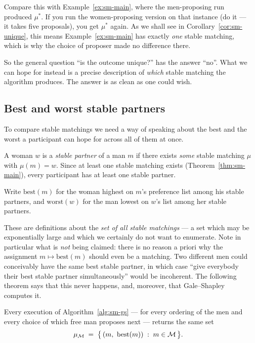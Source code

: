 \begin{remark}
Compare this with Example~\ref{ex:sm-main}, where the men-proposing run produced
$\mu^*$. If you run the women-proposing version on that instance (do it --- it
takes five proposals), you get $\mu^*$ again. As we shall see in
Corollary~\ref{cor:sm-unique}, this means Example~\ref{ex:sm-main} has exactly
\emph{one} stable matching, which is why the choice of proposer made no
difference there.
\end{remark}

So the general question ``is the outcome unique?'' has the answer ``no''. What
we can hope for instead is a precise description of \emph{which} stable
matching the algorithm produces. The answer is as clean as one could wish.

\subsection{Best and worst stable partners}

To compare stable matchings we need a way of speaking about the best and the
worst a participant can hope for across all of them at once.

\begin{definition}
A woman $w$ is a \emph{stable partner} of a man $m$ if there exists \emph{some}
stable matching $\mu$ with $\mu(m) = w$. Since at least one stable matching
exists (Theorem~\ref{thm:sm-main}), every participant has at least one stable
partner.

Write $\mathrm{best}(m)$ for the woman highest on $m$'s preference list among
his stable partners, and $\mathrm{worst}(w)$ for the man lowest on $w$'s list
among her stable partners.
\end{definition}

These are definitions about the \emph{set of all stable matchings} --- a set
which may be exponentially large and which we certainly do not want to
enumerate. Note in particular what is \emph{not} being claimed: there is no
reason a priori why the assignment $m \mapsto \mathrm{best}(m)$ should even be
a matching. Two different men could conceivably have the same best stable
partner, in which case ``give everybody their best stable partner
simultaneously'' would be incoherent. The following theorem says that this
never happens, and, moreover, that Gale--Shapley computes it.

\begin{theorem}\label{thm:sm-manoptimal}
Every execution of Algorithm~\ref{alg:sm-gs} --- for every ordering of the men
and every choice of which free man proposes next --- returns the same set
\[
  \mu_{\Men} \;=\; \bigl\{\,(m,\ \mathrm{best}(m)) \;:\; m \in \Men \,\bigr\}.
\]
\end{theorem}

